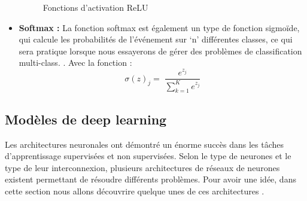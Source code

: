 \begin{itemize}[label=•]
                \begin{figure}[H]
                	\begin{center}
                	\end{center}
                	\caption {Fonctions d'activation ReLU}
                	\label{fig:relu}
                \end{figure}  

                \item \textbf{Softmax :} La fonction softmax est également un type de fonction sigmoïde, qui calcule les probabilités de l’événement sur ‘n’ différentes classes, ce qui sera pratique lorsque nous essayerons de gérer des problèmes de classification multi-class. \cite{ch2ref6, ch2ref12}. Avec la fonction :
                \begin{equation}\label{softmax}
                    \sigma (z)_j = \;  \frac{e^{z_j}}{\sum^K_{k=1} e^{z_j}}
                \end{equation}
                
                 \end{itemize}


    \subsection{Modèles de deep learning}
    
    \par Les architectures neuronales ont démontré un énorme succès dans les tâches d'apprentissage supervisées et non supervisées.
    Selon le type de neurones et le type de leur interconnexion, plusieurs architectures de réseaux de neurones existent permettant de résoudre différents problèmes. Pour avoir une idée, dans cette section nous allons découvrire quelque unes de ces architectures \cite{ch2ref12}.
    
